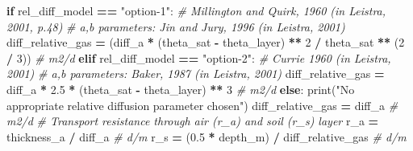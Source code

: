\documentclass[]{article}
\newenvironment{Shaded}{\begin{snugshade}}{\end{snugshade}}
\newcommand{\DecValTok}[1]{\textcolor[rgb]{0.00,0.00,0.81}{{#1}}}
\newcommand{\FloatTok}[1]{\textcolor[rgb]{0.00,0.00,0.81}{{#1}}}
\newcommand{\StringTok}[1]{\textcolor[rgb]{0.31,0.60,0.02}{{#1}}}
\newcommand{\CommentTok}[1]{\textcolor[rgb]{0.56,0.35,0.01}{\textit{{#1}}}}
\newcommand{\ControlFlowTok}[1]{\textcolor[rgb]{0.13,0.29,0.53}{\textbf{{#1}}}}
\newcommand{\OperatorTok}[1]{\textcolor[rgb]{0.81,0.36,0.00}{\textbf{{#1}}}}
\newcommand{\BuiltInTok}[1]{{#1}}
\newcommand{\NormalTok}[1]{{#1}}
\begin{document}
\begin{Shaded}
\begin{Highlighting}[]
        \ControlFlowTok{if} \NormalTok{rel_diff_model }\OperatorTok{==} \StringTok{"option-1"}\NormalTok{:}
            \CommentTok{# Millington and Quirk, 1960 (in Leistra, 2001, p.48)}
            \CommentTok{# a,b parameters: Jin and Jury, 1996 (in Leistra, 2001)}
            \NormalTok{diff_relative_gas }\OperatorTok{=} \NormalTok{(diff_a }\OperatorTok{*} \NormalTok{(theta_sat }\OperatorTok{-} \NormalTok{theta_layer) }\OperatorTok{**} \DecValTok{2} \OperatorTok{/}
                                 \NormalTok{theta_sat }\OperatorTok{**} \NormalTok{(}\DecValTok{2} \OperatorTok{/} \DecValTok{3}\NormalTok{))  }\CommentTok{# m2/d}
        \ControlFlowTok{elif} \NormalTok{rel_diff_model }\OperatorTok{==} \StringTok{"option-2"}\NormalTok{:}
            \CommentTok{# Currie 1960 (in Leistra, 2001)}
            \CommentTok{# a,b parameters: Baker, 1987 (in Leistra, 2001)}
            \NormalTok{diff_relative_gas }\OperatorTok{=} \NormalTok{diff_a }\OperatorTok{*} \FloatTok{2.5} \OperatorTok{*} \NormalTok{(theta_sat }\OperatorTok{-} \NormalTok{theta_layer) }\OperatorTok{**} \DecValTok{3}  \CommentTok{# m2/d}
        \ControlFlowTok{else}\NormalTok{:}
            \BuiltInTok{print}\NormalTok{(}\StringTok{"No appropriate relative diffusion parameter chosen"}\NormalTok{)}
            \NormalTok{diff_relative_gas }\OperatorTok{=} \NormalTok{diff_a  }\CommentTok{# m2/d}
        \CommentTok{# Transport resistance through air (r_a) and soil (r_s) layer}
        \NormalTok{r_a }\OperatorTok{=} \NormalTok{thickness_a }\OperatorTok{/} \NormalTok{diff_a  }\CommentTok{# d/m}
        \NormalTok{r_s }\OperatorTok{=} \NormalTok{(}\FloatTok{0.5} \OperatorTok{*} \NormalTok{depth_m) }\OperatorTok{/} \NormalTok{diff_relative_gas  }\CommentTok{# d/m}


\end{Highlighting}
\end{Shaded}
\end{document}
